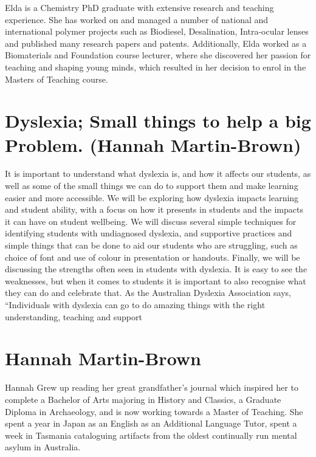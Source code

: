 \documentclass[twoside,14pt,a4paper,notitlepage]{memoir}
\begin{document}
Elda is a Chemistry PhD graduate with extensive research and teaching experience.  She has worked on and managed a number of national and international polymer projects such as Biodiesel, Desalination, Intra-ocular lenses and published many research papers and patents. Additionally, Elda worked as a Biomaterials and Foundation course lecturer, where she discovered her passion for teaching and shaping young minds, which resulted in her decision to enrol in the Masters of Teaching course.



\section*{Dyslexia; Small things to help a big Problem. (Hannah Martin-Brown)}
\label{aut:brown}

It is important to understand what dyslexia is, and how it affects our students, as well as some of the small things we can do to support them and make learning easier and more accessible.
We will be exploring how dyslexia impacts learning and student ability, with a focus on how it presents in students and the impacts it can have on student wellbeing. We will discuss several simple techniques for identifying students with undiagnosed dyslexia, and supportive practices and simple things that can be done to aid our students who are struggling, such as choice of font and use of colour in presentation or handouts.
Finally, we will be discussing the strengths often seen in students with dyslexia. It is easy to see the weaknesses, but when it comes to students it is important to also recognise what they can do and celebrate that. As the Australian Dyslexia Association says, “Individuals with dyslexia can go to do amazing things with the right understanding, teaching and support

\section*{Hannah Martin-Brown}

Hannah Grew up reading her great grandfather’s journal  which inspired her to complete a Bachelor of Arts majoring in History and Classics, a Graduate Diploma in Archaeology, and is now working towards a Master of Teaching. She spent a year in Japan as an English as an Additional Language Tutor, spent a week in Tasmania cataloguing artifacts from the oldest continually run mental asylum in Australia. 
\end{document}
